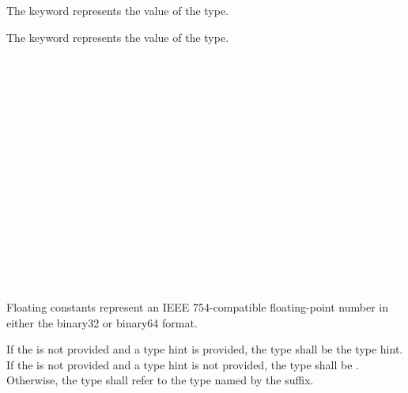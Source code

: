 \specsubsubitem
The  keyword represents the  value of the
 type.

\specsubsubitem
The  keyword represents the  value of the
 type.


\begin{grammar}
 \exactly \\
	     \\
	   \\

 \oneof \\
	 \\

 \exactly \\
	  \\

 \oneof \\
	 \\

 \exactly \\
	   \\

 \oneof \\
        \terminal{+}
        \terminal{-} \\

 \oneof \\
         \\
\end{grammar}

Floating constants represent an IEEE 754-compatible floating-point
number in either the binary32 or binary64 format.

\specsubitem
If the  is not provided and a type hint is
provided, the type shall be the type hint. If the 
is not provided and a type hint is not provided, the type shall be
. Otherwise, the type shall refer to the type named by the suffix.

